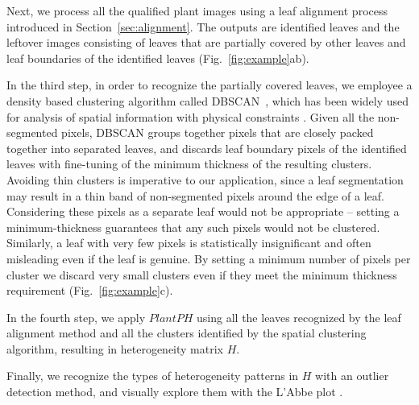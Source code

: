 \documentclass{bioinfo}
\begin{document}
\begin{methods}

Next, we process all the qualified plant images using a leaf alignment process introduced in Section~\ref{sec:alignment}. The outputs are identified leaves and the leftover images consisting of leaves that are partially covered by other leaves and leaf boundaries of the identified leaves (Fig.~\ref{fig:example}ab).
%

In the third step, in order to recognize the partially covered leaves, we employee a density based clustering algorithm called DBSCAN~\citep{ester1996density,kriegel2011density}, which has been widely used for analysis of spatial information with physical constraints \citep{zaiane2002clustering}. Given all the non-segmented pixels, DBSCAN groups together pixels that are closely packed together into separated leaves, and discards leaf boundary pixels of the identified leaves with fine-tuning of the minimum thickness of the resulting clusters. Avoiding thin clusters is imperative to our application, since a leaf segmentation may result in a thin band of non-segmented pixels around the edge of a leaf. Considering these pixels as a separate leaf would not be appropriate -- setting a minimum-thickness guarantees that any such pixels would not be clustered. Similarly, a leaf with very few pixels is statistically insignificant and often misleading even if the leaf is genuine. By setting a minimum number of pixels per cluster we discard very small clusters even if they meet the minimum thickness requirement (Fig.~\ref{fig:example}c).

In the fourth step, we apply $PlantPH$  using all the leaves recognized by the leaf alignment method and all the clusters identified by the spatial clustering algorithm, resulting in heterogeneity matrix $H$.

Finally, we recognize the types of heterogeneity patterns in $H$ with an outlier detection method, and visually explore them with the L'Abbe plot \citep{song1999exploring}.


\end{methods}
\end{document}
